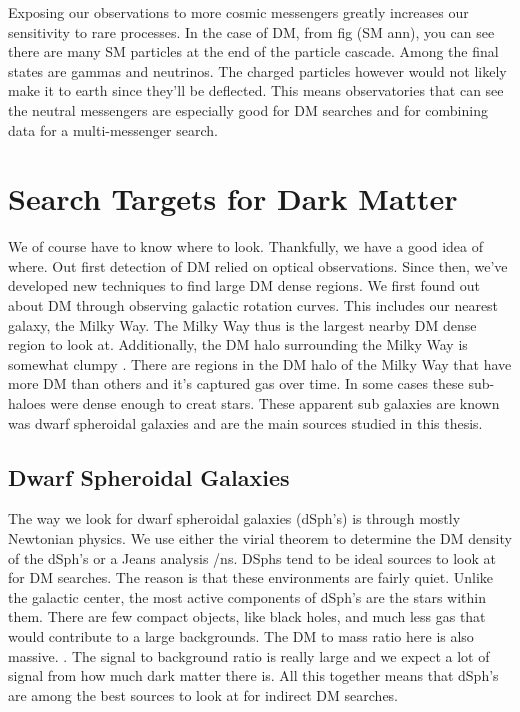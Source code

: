 Exposing our observations to more cosmic messengers greatly increases our sensitivity to rare processes.
In the case of DM, from fig (SM ann), you can see there are many SM particles at the end of the particle cascade.
Among the final states are gammas and neutrinos.
The charged particles however would not likely make it to earth since they'll be deflected.
This means observatories that can see the neutral messengers are especially good for DM searches and for combining data for a multi-messenger search.



\section{Search Targets for Dark Matter\label{sec:dm_targets}}
We of course have to know where to look.
Thankfully, we have a good idea of where.
Out first detection of DM relied on optical observations.
Since then, we've developed new techniques to find large DM dense regions.
We first found out about DM through observing galactic rotation curves.
This includes our nearest galaxy, the Milky Way.
The Milky Way thus is the largest nearby DM dense region to look at.
Additionally, the DM halo surrounding the Milky Way is somewhat clumpy \ns.
There are regions in the DM halo of the Milky Way that have more DM than others and it's captured gas over time.
In some cases these sub-haloes were dense enough to creat stars.
These apparent sub galaxies are known was dwarf spheroidal galaxies and are the main sources studied in this thesis.

\subsection{Dwarf Spheroidal Galaxies\label{sec:dSphs}}

The way we look for dwarf spheroidal galaxies (dSph's) is through mostly Newtonian physics.
We use either the virial theorem to determine the DM density of the dSph's or a Jeans analysis /ns.
DSphs tend to be ideal sources to look at for DM searches.
The reason is that these environments are fairly quiet.
Unlike the galactic center, the most active components of dSph's are the stars within them.
There are few compact objects, like black holes, and much less gas that would contribute to a large backgrounds.
The DM to mass ratio here is also massive. \ns.
The signal to background ratio is really large and we expect a lot of signal from how much dark matter there is.
All this together means that dSph's are among the best sources to look at for indirect DM searches.